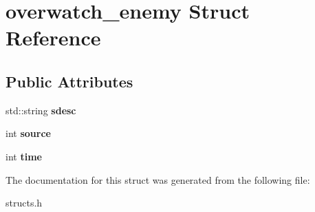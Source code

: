 \hypertarget{structoverwatch__enemy}{\section{overwatch\-\_\-enemy Struct Reference}
\label{structoverwatch__enemy}
}
\subsection*{Public Attributes}
\begin{DoxyCompactItemize}
\item 
\hypertarget{structoverwatch__enemy_a6b56a0e4b9e94f5deb415e210f5aab68}{std\-::string {\bfseries sdesc}}\label{structoverwatch__enemy_a6b56a0e4b9e94f5deb415e210f5aab68}

\item 
\hypertarget{structoverwatch__enemy_aba2d74736f768cd239a410b671042fa8}{int {\bfseries source}}\label{structoverwatch__enemy_aba2d74736f768cd239a410b671042fa8}

\item 
\hypertarget{structoverwatch__enemy_aa251cd972dd125d8f130b3b7f03dbd69}{int {\bfseries time}}\label{structoverwatch__enemy_aa251cd972dd125d8f130b3b7f03dbd69}

\end{DoxyCompactItemize}


The documentation for this struct was generated from the following file\-:\begin{DoxyCompactItemize}
\item 
structs.\-h\end{DoxyCompactItemize}
